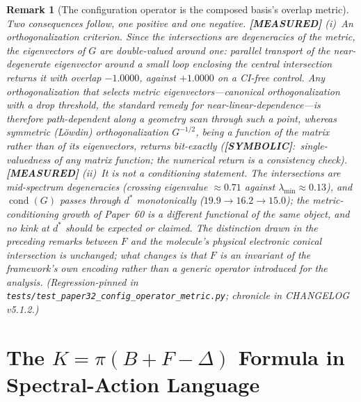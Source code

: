 \documentclass[11pt]{article}
\newtheorem{remark}{Remark}
\begin{document}
\begin{remark}[The configuration operator is the composed basis's overlap metric]
Two consequences follow, one positive and one negative.  \textbf{[MEASURED]} \emph{(i)~An
orthogonalization criterion.}  Since the intersections are degeneracies
of the metric, the eigenvectors of $G$ are double-valued around one:
parallel transport of the near-degenerate eigenvector around a small loop
enclosing the central intersection returns it with overlap $-1.0000$,
against $+1.0000$ on a CI-free control.  Any orthogonalization that
\emph{selects} metric eigenvectors---canonical orthogonalization with a
drop threshold, the standard remedy for near-linear-dependence---is
therefore path-dependent along a geometry scan through such a point,
whereas symmetric (L\"owdin) orthogonalization $G^{-1/2}$, being a
function of the matrix rather than of its eigenvectors, returns
bit-exactly (\textbf{[SYMBOLIC]}:\ single-valuedness of any matrix
function; the numerical return is a consistency check).  \textbf{[MEASURED]} \emph{(ii)~It is not a conditioning statement.}  The
intersections are \emph{mid}-spectrum degeneracies (crossing eigenvalue
$\approx 0.71$ against $\lambda_{\min} \approx 0.13$), and
$\operatorname{cond}(G)$ passes through $d^*$ monotonically
($19.9 \to 16.2 \to 15.0$); the metric-conditioning growth of Paper~60 is
a different functional of the same object, and no kink at $d^*$ should be
expected or claimed.  The distinction drawn in the preceding remarks
between $F$ and the molecule's \emph{physical electronic} conical
intersection is unchanged; what changes is that $F$ is an invariant of the
framework's own encoding rather than a generic operator introduced for the
analysis.  (Regression-pinned in
\texttt{tests/test\_paper32\_config\_operator\_metric.py}; chronicle in
CHANGELOG v5.1.2.)
\end{remark}

\section{The $K = \pi(B + F - \Delta)$ Formula in Spectral-Action
Language}
\label{sec:K_decomposition}
\end{document}

